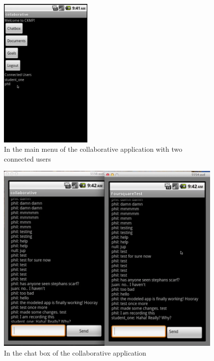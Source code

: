 \begin{figure}[h!]
\centering
\includegraphics[width=0.4\textwidth]{images/chap7_connected.png}
\caption{In the main menu of the collaborative application with two connected users}
\label{fig:coll_connected}
\end{figure}


\begin{figure}[h!]
\centering
\includegraphics[width=0.99\textwidth]{images/chap7_chatbox.png}
\caption{In the chat box of the collaborative application}
\label{fig:coll_chatbox}
\end{figure}

